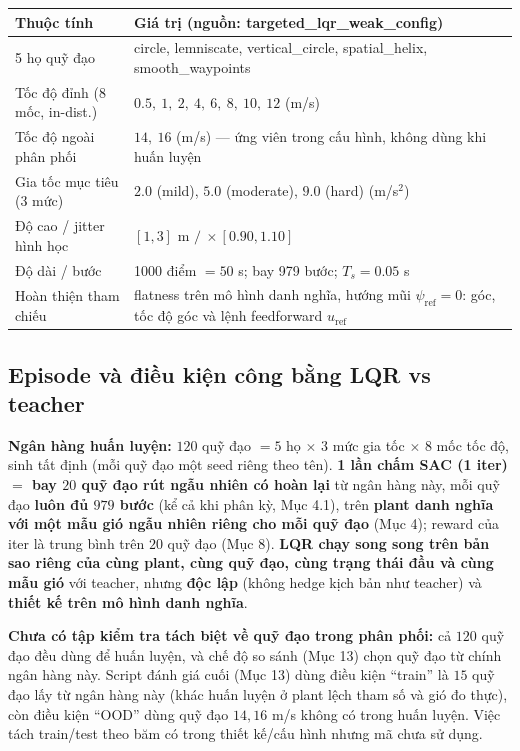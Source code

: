 \documentclass[11pt]{article}
\begin{document}
\begin{center}\small
\begin{tabular}{@{}p{4.6cm} p{9.8cm}@{}}
\toprule
\textbf{Thuộc tính} & \textbf{Giá trị (nguồn: targeted\_lqr\_weak\_config)}\\
\midrule
5 họ quỹ đạo & circle, lemniscate, vertical\_circle, spatial\_helix, smooth\_waypoints\\
Tốc độ đỉnh (8 mốc, in-dist.) & $0.5,\ 1,\ 2,\ 4,\ 6,\ 8,\ 10,\ 12$ (m/s)\\
Tốc độ ngoài phân phối & $14,\ 16$ (m/s) --- ứng viên trong cấu hình, không dùng khi huấn luyện\\
Gia tốc mục tiêu (3 mức) & $2.0$ (mild), $5.0$ (moderate), $9.0$ (hard) (m/s$^2$)\\
Độ cao / jitter hình học & $[1,3]$ m $/\ \times[0.90,1.10]$\\
Độ dài / bước & 1000 điểm $=50$ s; bay 979 bước; $T_s=0.05$ s\\
Hoàn thiện tham chiếu & flatness trên mô hình danh nghĩa, hướng mũi $\psi_{\mathrm{ref}}=0$: góc, tốc độ
góc và lệnh feedforward $u_{\mathrm{ref}}$\\
\bottomrule
\end{tabular}
\end{center}

\subsection{Episode và điều kiện công bằng LQR vs teacher}
\textbf{Ngân hàng huấn luyện:} $120$ quỹ đạo $=5$ họ $\times$ $3$ mức gia tốc $\times$ $8$ mốc tốc độ, sinh
tất định (mỗi quỹ đạo một seed riêng theo tên). \textbf{1 lần chấm SAC (1 iter) $=$ bay $20$ quỹ đạo rút
ngẫu nhiên có hoàn lại} từ ngân hàng này, mỗi quỹ đạo \textbf{luôn đủ $979$ bước} (kể cả khi phân kỳ, Mục
4.1), trên \textbf{plant danh nghĩa với một mẫu gió ngẫu nhiên riêng cho mỗi quỹ đạo} (Mục 4); reward của
iter là trung bình trên $20$ quỹ đạo (Mục 8).
\textbf{LQR chạy song song trên bản sao riêng của cùng plant, cùng quỹ đạo, cùng trạng thái đầu và cùng mẫu
gió} với teacher, nhưng \textbf{độc lập} (không hedge kịch bản như teacher) và \textbf{thiết kế trên mô hình
danh nghĩa}.

\noindent\textbf{Chưa có tập kiểm tra tách biệt về quỹ đạo trong phân phối:} cả $120$ quỹ đạo đều dùng để
huấn luyện, và chế độ so sánh (Mục 13) chọn quỹ đạo từ chính ngân hàng này. Script đánh giá cuối (Mục 13)
dùng điều kiện ``train'' là $15$ quỹ đạo lấy từ ngân hàng này (khác huấn luyện ở plant lệch tham số và gió
đo thực), còn điều kiện ``OOD'' dùng quỹ đạo $14,16$ m/s không có trong huấn luyện. Việc tách train/test theo
băm có trong thiết kế/cấu hình nhưng mã chưa sử dụng.
\end{document}
